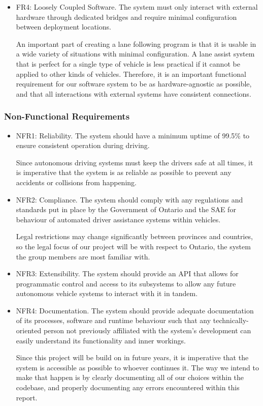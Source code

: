 \documentclass[titlepage]{article}
\begin{document}
\begin{itemize}
	\item FR4: Loosely Coupled Software. The system must only interact with external hardware through dedicated bridges and require minimal configuration between deployment locations.

	An important part of creating a lane following program is that it is usable in a wide variety of situations with minimal configuration. A lane assist system that is perfect for a single type of vehicle is less practical if it cannot be applied to other kinds of vehicles. Therefore, it is an important functional requirement for our software system to be as hardware-agnostic as possible, and that all interactions with external systems have consistent connections.
	 
\end{itemize}

\subsubsection{Non-Functional Requirements}
\begin{itemize}
	\item NFR1: Reliability. 
The system should have a minimum uptime of 99.5\% to ensure consistent operation during driving.

Since autonomous driving systems must keep the drivers safe at all times, it is imperative that the system is as reliable as possible to prevent any accidents or collisions from happening.

	\item NFR2: Compliance. 
The system should comply with any regulations and standards put in place by the Government of Ontario and the SAE for behaviour of automated driver assistance systems within vehicles.

Legal restrictions may change significantly between provinces and countries, so the legal focus of our project will be with respect to Ontario, the system the group members are most familiar with.

	\item NFR3: Extensibility. The system should provide an API that allows for programmatic control and access to its subsystems to allow any future autonomous vehicle systems to interact with it in tandem.

	\item NFR4: Documentation. 
The system should provide adequate documentation of its processes, software and runtime behaviour such that any technically-oriented person not previously affiliated with the system’s development can easily understand its functionality and inner workings.

Since this project will be build on in future years, it is imperative that the system is accessible as possible to whoever continues it. The way we intend to make that happen is by clearly documenting all of our choices within the codebase, and properly documenting any errors encountered within this report.

\end{itemize}
\end{document}

